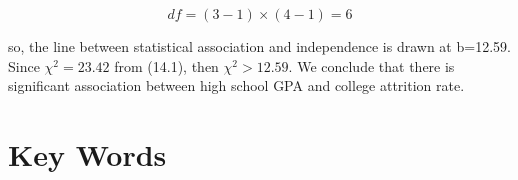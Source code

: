 \documentclass[11pt, chapterprefix=true]{scrbook}\usepackage[]{graphicx}\usepackage[]{color}
\begin{document}
\begin{equation*}
df = (3 - 1) \times (4 - 1) = 6
\end{equation*}

so, the line between statistical association and independence is drawn at b=12.59.  
Since $\chi^2 = 23.42$ from (14.1), then $\chi^2 > 12.59$.   We conclude that there is significant association between high school GPA and college attrition rate.

\section{Key Words}


\twocolumn

\section{}
 
\end{document}
